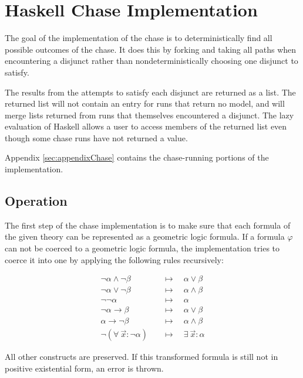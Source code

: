 \section{Haskell Chase Implementation}
\label{sec:implementation}

	The goal of the implementation of the chase is to deterministically find
	all possible outcomes of the chase. It does this by forking and taking all
	paths when encountering a disjunct rather than nondeterministically
	choosing one disjunct to satisfy.

	The results from the attempts to satisfy each disjunct are returned as a
	list. The returned list will not contain an entry for runs that return no
	model, and will merge lists returned from runs that themselves encountered
	a disjunct. The lazy evaluation of Haskell allows a user to access members
	of the returned list even though some chase runs have not returned a value.

	Appendix \ref{sec:appendixChase} contains the chase-running portions of the
	implementation.

	\subsection{Operation}

		The first step of the chase implementation is to make sure that each
		formula of the given theory can be represented as a geometric logic
		formula. If a formula $\varphi$ can not be coerced to a geometric logic
		formula, the implementation tries to coerce it into one by applying the
		following rules recursively:

		\begin{align*}
		\neg\alpha \wedge \neg\beta         \quad & \mapsto \quad \alpha \vee \beta        \\
		\neg\alpha \vee \neg\beta           \quad & \mapsto \quad \alpha \wedge \beta      \\
		\neg\neg\alpha                      \quad & \mapsto \quad \alpha                   \\
		\neg\alpha \to \beta                \quad & \mapsto \quad \alpha \vee \beta        \\
		\alpha \to \neg\beta                \quad & \mapsto \quad \alpha \wedge \beta      \\
		\neg(\forall\ \vec{x} : \neg\alpha) \quad & \mapsto \quad \exists\ \vec{x} : \alpha
		\end{align*}

		All other constructs are preserved. If this transformed formula is still
		not in positive existential form, an error is thrown.

